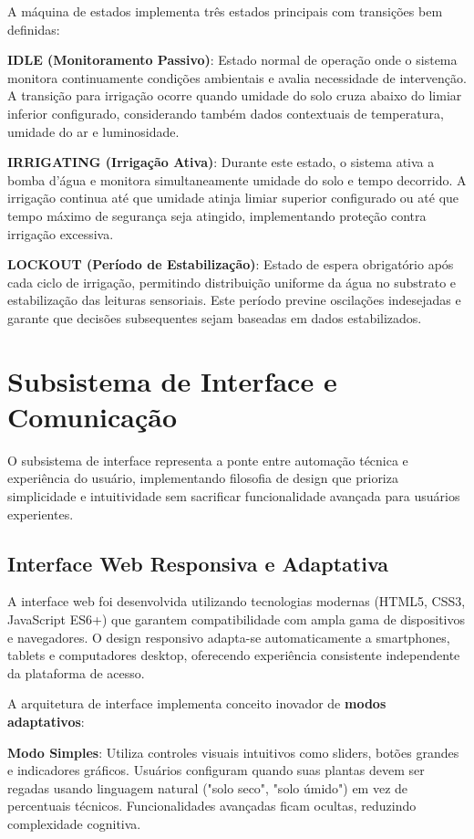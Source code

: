 \documentclass[oneside,english,brazilian]{UNISINOSmonografia}
\begin{document}
A máquina de estados implementa três estados principais com transições bem definidas:

\textbf{IDLE (Monitoramento Passivo)}: Estado normal de operação onde o sistema monitora continuamente condições ambientais e avalia necessidade de intervenção. A transição para irrigação ocorre quando umidade do solo cruza abaixo do limiar inferior configurado, considerando também dados contextuais de temperatura, umidade do ar e luminosidade.

\textbf{IRRIGATING (Irrigação Ativa)}: Durante este estado, o sistema ativa a bomba d'água e monitora simultaneamente umidade do solo e tempo decorrido. A irrigação continua até que umidade atinja limiar superior configurado ou até que tempo máximo de segurança seja atingido, implementando proteção contra irrigação excessiva.

\textbf{LOCKOUT (Período de Estabilização)}: Estado de espera obrigatório após cada ciclo de irrigação, permitindo distribuição uniforme da água no substrato e estabilização das leituras sensoriais. Este período previne oscilações indesejadas e garante que decisões subsequentes sejam baseadas em dados estabilizados.

\section{Subsistema de Interface e Comunicação}

O subsistema de interface representa a ponte entre automação técnica e experiência do usuário, implementando filosofia de design que prioriza simplicidade e intuitividade sem sacrificar funcionalidade avançada para usuários experientes.

\subsection{Interface Web Responsiva e Adaptativa}

A interface web foi desenvolvida utilizando tecnologias modernas (HTML5, CSS3, JavaScript ES6+) que garantem compatibilidade com ampla gama de dispositivos e navegadores. O design responsivo adapta-se automaticamente a smartphones, tablets e computadores desktop, oferecendo experiência consistente independente da plataforma de acesso.

A arquitetura de interface implementa conceito inovador de \textbf{modos adaptativos}:

\textbf{Modo Simples}: Utiliza controles visuais intuitivos como sliders, botões grandes e indicadores gráficos. Usuários configuram quando suas plantas devem ser regadas usando linguagem natural ("solo seco", "solo úmido") em vez de percentuais técnicos. Funcionalidades avançadas ficam ocultas, reduzindo complexidade cognitiva.
\end{document}
